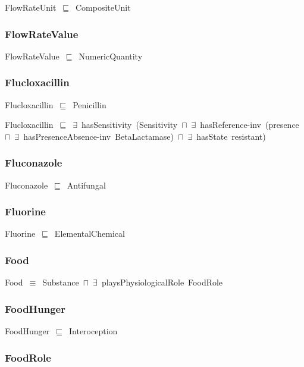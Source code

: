 \documentclass{article}
\begin{document}
FlowRateUnit~\ensuremath{\sqsubseteq}~CompositeUnit~

\subsubsection*{FlowRateValue}

FlowRateValue~\ensuremath{\sqsubseteq}~NumericQuantity~

\subsubsection*{Flucloxacillin}

Flucloxacillin~\ensuremath{\sqsubseteq}~Penicillin~

Flucloxacillin~\ensuremath{\sqsubseteq}~\ensuremath{\exists}~hasSensitivity~(Sensitivity~\ensuremath{\sqcap}~\ensuremath{\exists}~hasReference-inv~(presence~\ensuremath{\sqcap}~\ensuremath{\exists}~hasPresenceAbsence-inv~BetaLactamase)~\ensuremath{\sqcap}~\ensuremath{\exists}~hasState~resistant)~

\subsubsection*{Fluconazole}

Fluconazole~\ensuremath{\sqsubseteq}~Antifungal~

\subsubsection*{Fluorine}

Fluorine~\ensuremath{\sqsubseteq}~ElementalChemical~

\subsubsection*{Food}

Food~\ensuremath{\equiv}~Substance~\ensuremath{\sqcap}~\ensuremath{\exists}~playsPhysiologicalRole~FoodRole

\subsubsection*{FoodHunger}

FoodHunger~\ensuremath{\sqsubseteq}~Interoception~

\subsubsection*{FoodRole}
\end{document}

